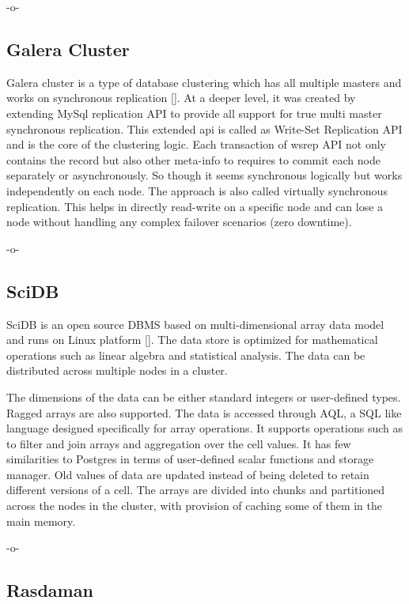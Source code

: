      -o-

\subsection{Galera Cluster}

Galera cluster is a type of database clustering which has all multiple
masters and works on synchronous
replication [\cite{www-galera-cluster}].  At a deeper level, it was
created by extending MySql replication API to provide all support for
true multi master synchronous replication.  This extended api is
called as Write-Set Replication API and is the core of the clustering
logic.  Each transaction of wsrep API not only contains the record but
also other meta-info to requires to commit each node separately or
asynchronously. So though it seems synchronous logically but works
independently on each node.  The approach is also called virtually
synchronous replication. This helps in directly read-write on a
specific node and can lose a node without handling any complex
failover scenarios (zero downtime).

     -o-

\subsection{SciDB}

SciDB is an open source DBMS based on multi-dimensional array data
model and runs on Linux platform [\cite{ercimnews}]. The data store is
optimized for mathematical operations such as linear algebra and
statistical analysis. The data can be distributed across multiple
nodes in a cluster.

The dimensions of the data can be either standard integers or
user-defined types. Ragged arrays are also supported. The data is
accessed through AQL, a SQL like language designed specifically for
array operations. It supports operations such as to filter and join
arrays and aggregation over the cell values. It has few similarities
to Postgres in terms of user-defined scalar functions and storage
manager. Old values of data are updated instead of being deleted to
retain different versions of a cell.  The arrays are divided into
chunks and partitioned across the nodes in the cluster, with provision
of caching some of them in the main memory.

     -o-

\subsection{Rasdaman}


